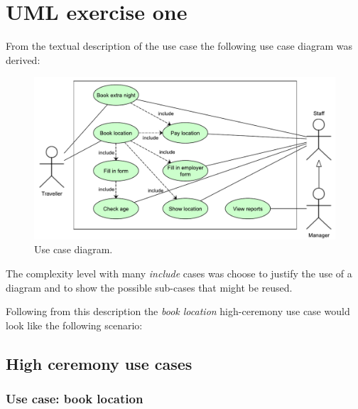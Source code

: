 \chapter{UML exercise one}\label{ch:uml}

From the textual description of the use case the following use case diagram was derived:

\begin{figure}[H]
\begin{centering}
\includegraphics[width=\textwidth]{gfx/usecase.pdf} 
\end{centering}
\caption{Use case diagram.}
\label{fig:usecase}
\end{figure}

The complexity level with many \textit{include} cases was choose to justify the use of a diagram and to show the possible sub-cases that might be reused.

Following from this description the \textit{book location} high-ceremony use case would look like the following scenario:

\section{High ceremony use cases}

\subsection{Use case: book location}

